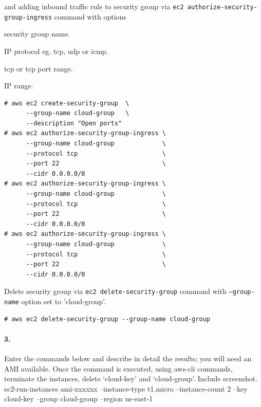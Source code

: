 \documentclass[a4paper]{article}
\begin{document}
and adding inbound traffic rule to security group via \texttt{ec2 authorize-security-group-ingress} command with options
\begin{description}
\leftskip 0.4in
\parindent -0.4in
	\item[\texttt{--group-name} : ] security group name.
	\item[\texttt{--protocol} : ] IP protocol eg. tcp, udp or icmp.
	\item[\texttt{--port} : ] tcp or tcp port range.
	\item[\texttt{-cidr} : ] IP range.
\end{description}
\begin{verbatim}
# aws ec2 create-security-group  \
      --group-name cloud-group   \
      --description "Open ports"
# aws ec2 authorize-security-group-ingress \
      --group-name cloud-group             \
      --protocol tcp                       \
      --port 22                            \
      --cidr 0.0.0.0/0
# aws ec2 authorize-security-group-ingress \
      --group-name cloud-group             \
      --protocol tcp                       \
      --port 22                            \
      --cidr 0.0.0.0/0
# aws ec2 authorize-security-group-ingress \
      --group-name cloud-group             \
      --protocol tcp                       \
      --port 22                            \
      --cidr 0.0.0.0/0
\end{verbatim}

Delete security group via \texttt{ec2 delete-security-group} command with \texttt{--group-name} option set to 'cloud-group'.

\begin{verbatim}
# aws ec2 delete-security-group --group-name cloud-group
\end{verbatim}

\paragraph{3. } Enter the commands below and describe in detail the results; you will need an AMI available. Once the command is executed, using aws-cli commands, terminate the instances, delete ‘cloud-key’ and ‘cloud-group’. Include screenshot. \\
ec2-run-instances ami-xxxxxx --instance-type t1.micro --instance-count 2  --key cloud-key  --group cloud-group  --region us-east-1

\end{document}
